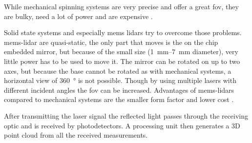 While mechanical spinning systems are very precise and offer a great \gls{fov}, they are bulky, need a lot of power and are expensive \cite{Fujii2005}.\par
Solid state systems and especially \gls{mems} \glspl{lidar} try to overcome those problems.
\gls{mems}-\gls{lidar} are quasi-static, the only part that moves is the on the chip embedded mirror, but because of the small size (\SIrange{1}{7}{\milli\metre} diameter), very little power has to be used to move it.
The mirror can be rotated on up to two axes, but because the base cannot be rotated as with mechanical systems, a horizontal view of \SI{360}{\degree} is not possible.
Though by using multiple lasers with different incident angles the \gls{fov} can be increased.
Advantages of \gls{mems}-\glspl{lidar} compared to mechanical systems are the smaller form factor and lower cost \cite{Wang2020}.\par
After transmitting the laser signal the reflected light passes through the receiving optic and is received by photodetectors.
A processing unit then generates a 3D point cloud from all the received measurements.


